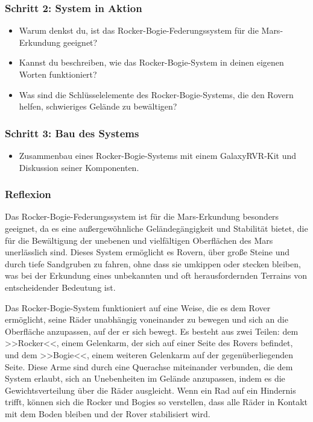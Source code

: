 \documentclass{vorlage-design-main}
\begin{document}
\hypertarget{schritt-2-system-in-aktion}{%
\subsubsection{Schritt 2: System in
Aktion}\label{schritt-2-system-in-aktion}}

\begin{itemize}
\item
  Warum denkst du, ist das Rocker-Bogie-Federungssystem für die
  Mars-Erkundung geeignet?
\item
  Kannst du beschreiben, wie das Rocker-Bogie-System in deinen eigenen
  Worten funktioniert?
\item
  Was sind die Schlüsselelemente des Rocker-Bogie-Systems, die den
  Rovern helfen, schwieriges Gelände zu bewältigen?
\end{itemize}

\hypertarget{schritt-3-bau-des-systems}{%
\subsubsection{Schritt 3: Bau des
Systems}\label{schritt-3-bau-des-systems}}

\begin{itemize}

\item
  Zusammenbau eines Rocker-Bogie-Systems mit einem GalaxyRVR-Kit und
  Diskussion seiner Komponenten.
\end{itemize}

\hypertarget{reflexion}{%
\subsubsection{Reflexion}\label{reflexion}}

Das Rocker-Bogie-Federungssystem ist für die Mars-Erkundung besonders
geeignet, da es eine außergewöhnliche Geländegängigkeit und Stabilität
bietet, die für die Bewältigung der unebenen und vielfältigen
Oberflächen des Mars unerlässlich sind. Dieses System ermöglicht es
Rovern, über große Steine und durch tiefe Sandgruben zu fahren, ohne
dass sie umkippen oder stecken bleiben, was bei der Erkundung eines
unbekannten und oft herausfordernden Terrains von entscheidender
Bedeutung ist.

Das Rocker-Bogie-System funktioniert auf eine Weise, die es dem Rover
ermöglicht, seine Räder unabhängig voneinander zu bewegen und sich an
die Oberfläche anzupassen, auf der er sich bewegt. Es besteht aus zwei
Teilen: dem >>Rocker<<, einem Gelenkarm, der sich auf einer Seite des
Rovers befindet, und dem >>Bogie<<, einem weiteren Gelenkarm auf der
gegenüberliegenden Seite. Diese Arme sind durch eine Querachse
miteinander verbunden, die dem System erlaubt, sich an Unebenheiten im
Gelände anzupassen, indem es die Gewichtsverteilung über die Räder
ausgleicht. Wenn ein Rad auf ein Hindernis trifft, können sich die
Rocker und Bogies so verstellen, dass alle Räder in Kontakt mit dem
Boden bleiben und der Rover stabilisiert wird.
\end{document}
